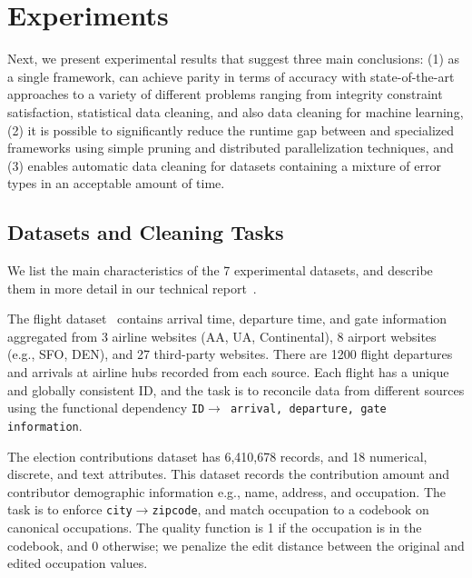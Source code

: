 \section{Experiments}\label{s:exp}
Next, we present experimental results that suggest three main conclusions: (1) as a single framework, \sys can achieve parity in terms of accuracy with state-of-the-art approaches to a variety of different problems ranging from integrity constraint satisfaction, statistical data cleaning, and also data cleaning for machine learning, (2) it is possible to significantly reduce the runtime gap between \sys and specialized frameworks using simple pruning and distributed parallelization techniques, and (3) \sys enables automatic data cleaning for datasets containing a mixture of error types in an acceptable amount of time.  

\subsection{Datasets and Cleaning Tasks}
We list the main characteristics of the 7 experimental datasets, and describe them in more detail in our technical report~\cite{xxx}.

 The flight dataset~\cite{data-flights} contains arrival time, departure time, and gate information aggregated from 3 airline websites (AA, UA, Continental), 8 airport websites (e.g., SFO, DEN), and 27 third-party websites.
There are 1200 flight departures and arrivals at airline hubs recorded from each source.  Each flight has a unique and globally consistent ID, and the task is to reconcile data from different sources using the functional dependency \texttt{ID$\rightarrow$ arrival, departure, gate information}.


 The election contributions dataset has 6,410,678 records, and 18 numerical, discrete, and text attributes. This dataset records the contribution amount and contributor demographic information e.g., name, address, and occupation.  The task is to enforce \texttt{city$\rightarrow$zipcode}, and match occupation to a codebook on canonical occupations.  The quality function is 1 if the occupation is in the codebook, and 0 otherwise; we penalize the edit distance between the original and edited occupation values.

